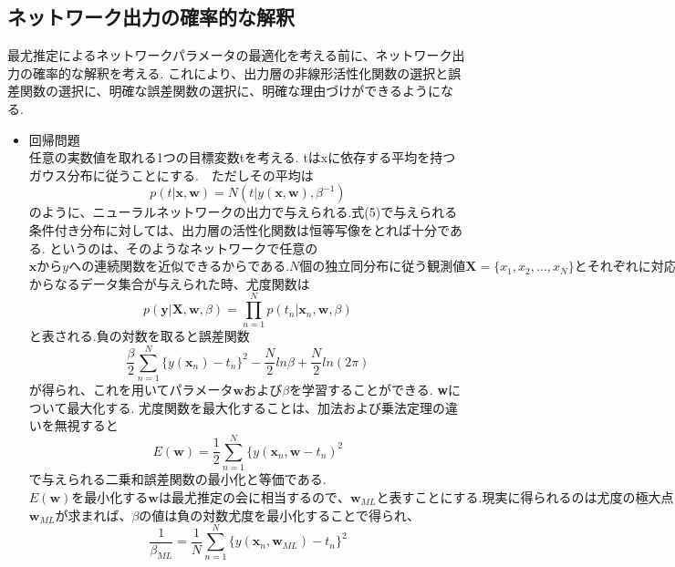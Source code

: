 \documentclass[11pt,a4paper]{jsarticle}
\begin{document}
\subsection*{ネットワーク出力の確率的な解釈}
最尤推定によるネットワークパラメータの最適化を考える前に、ネットワーク出力の確率的な解釈を考える. これにより、出力層の非線形活性化関数の選択と誤差関数の選択に、明確な誤差関数の選択に、明確な理由づけができるようになる.
\begin{itemize}
  \item 回帰問題\\
  任意の実数値を取れる1つの目標変数tを考える. tはxに依存する平均を持つガウス分布に従うことにする.　ただしその平均は
  \begin{equation}
    p(t|\textbf{x}, \textbf{w})  = N(t|y(\textbf{x}, \textbf{w}) ,\beta^{-1})
  \end{equation}
  のように、ニューラルネットワークの出力で与えられる.式(5)で与えられる条件付き分布に対しては、出力層の活性化関数は恒等写像をとれば十分である. というのは、そのようなネットワークで任意の$\textbf{x}からyへの連続関数を近似できるからである.N個の　独立同分布に従う観測値\textbf{X} =\{x_1,x_2,...,x_N\}とそれぞれに対応する目標値\textbf{t}=\{t_1,t_2,...,t_N\}$からなるデータ集合が与えられた時、尤度関数は
  \begin{equation}
    p(\textbf{y}|\textbf{X},\textbf{w}, \beta)  = \prod_{n=1}^{N} p(t_n | \textbf{x}_n, \textbf{w}, \beta)
  \end{equation}
  と表される.負の対数を取ると誤差関数
  \begin{equation}
    \frac{\beta}{2} \sum_{n=1}^{N} \{y(\textbf{x}_n)-t_n \}^2 - \frac{N}{2} ln \beta + \frac{N}{2} ln(2 \pi )
  \end{equation}
  が得られ、これを用いて$パラメータ\textbf{w}および\beta$を学習することができる. \textbf{w}について最大化する. 尤度関数を最大化することは、加法および乗法定理の違いを無視すると
  \begin{equation}
    E(\textbf{w})=\frac{1}{2}\sum_{n=1}^{N} \{y(\textbf{x}_n, \textbf{w} - t_n)^2
  \end{equation}
  で与えられる二乗和誤差関数の最小化と等価である.$E(\textbf{w})を最小化する\textbf{w}は最尤推定の会に相当するので、\textbf{w}_{ML}と表すことにする.現実に得られるのは尤度の極大点(誤差関数の極小点に相当)である.このことは次節で議論する.$
  $\textbf{w}_{ML}が求まれば、\beta$の値は負の対数尤度を最小化することで得られ、
  \begin{equation}
    \frac{1}{\beta_{ML}} = \frac{1}{N} \sum_{n=1}^{N} \{y(\textbf{x}_n, \textbf{w}_{ML}) - t_n \} ^2

\end{equation}
\end{itemize}
\end{document}
